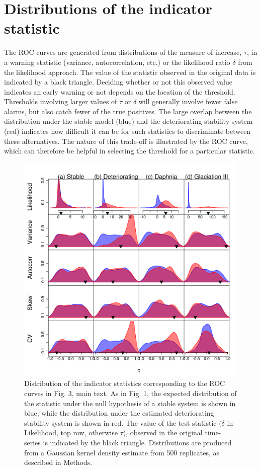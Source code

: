 \documentclass[11pt]{elsarticle}
\begin{document}
 \section{Distributions of the indicator statistic}
The ROC curves are generated from distributions of the measure of increase, $\tau$, in a warning statistic (variance, autocorrelation, etc.) or the likelihood ratio $\delta$ from the likelihood approach.  The value of the statistic observed in the original data is indicated by a black triangle. Deciding whether or not this observed value indicates an early warning or not depends on the location of the threshold.  Thresholds involving larger values of $\tau$ or $\delta$ will generally involve fewer false alarms, but also catch fewer of the true positives.  The large overlap between the distribution under the stable model (blue) and the deteriorating stability system (red) indicates how difficult it can be for such statistics to discriminate between these alternatives.  The nature of this trade-off is illustrated by the ROC curve, which can therefore be helpful in selecting the threshold for a particular statistic.  


\begin{figure}[ht]
  \begin{center}
    \includegraphics{FigS1.pdf}
  \end{center}
  \caption{Distribution of the indicator statistics corresponding to the ROC curves in Fig. 3, main text. As in Fig. 1, the expected distribution of the statistic under the null hypothesis of a stable system is shown in blue, while the distribution under the estimated deteriorating stability system is shown in red.  The value of the test statistic ($\delta$ in Likelihood, top row, otherwise $\tau$), observed in the original time-series is indicated by the black triangle. Distributions are produced from a Gaussian kernel density estimate from 500 replicates, as described in Methods.}
  \label{fig:S1}
\end{figure}
\end{document}
